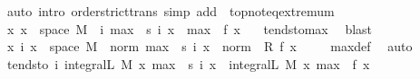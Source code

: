 \begin{isabellebody}
\ {\isacharparenleft}{\kern0pt}auto\ intro{\isacharcolon}{\kern0pt}\ order{\isachardot}{\kern0pt}strict{\isacharunderscore}{\kern0pt}trans{}\ simp\ add{\isacharcolon}{\kern0pt}\ \ top{\isachardot}{\kern0pt}not{\isacharunderscore}{\kern0pt}eq{\isacharunderscore}{\kern0pt}extremum{\isacharparenright}{\kern0pt}\isanewline
\ \ \ \ \isamarkupfalse%
\ {\isachardoublequoteopen}{\isasymAnd}x{\isachardot}{\kern0pt}\ x\ {\isasymin}\ space\ M\ {\isasymLongrightarrow}\ {\isacharparenleft}{\kern0pt}{\isasymlambda}i{\isachardot}{\kern0pt}\ max\ {}\ {\isacharparenleft}{\kern0pt}s\ i\ x{\isacharparenright}{\kern0pt}{\isacharparenright}{\kern0pt}\ {\isasymlonglonglongrightarrow}\ max\ {}\ {\isacharparenleft}{\kern0pt}f\ x{\isacharparenright}{\kern0pt}{\isachardoublequoteclose}\ \isamarkupfalse%
\ {\isacharasterisk}{\kern0pt}{\isacharparenleft}{\kern0pt}{}{\isacharparenright}{\kern0pt}\ tendsto{\isacharunderscore}{\kern0pt}max\ \isamarkupfalse%
\ blast\isanewline
\ \ \ \ \isamarkupfalse%
\ \isamarkupfalse%
\ {\isachardoublequoteopen}{\isasymAnd}x\ i{\isachardot}{\kern0pt}\ x\ {\isasymin}\ space\ M\ {\isasymLongrightarrow}\ norm\ {\isacharparenleft}{\kern0pt}max\ {}\ {\isacharparenleft}{\kern0pt}s\ i\ x{\isacharparenright}{\kern0pt}{\isacharparenright}{\kern0pt}\ {\isasymle}\ norm\ {\isacharparenleft}{\kern0pt}{}\ {\isacharasterisk}{\kern0pt}\isactrlsub R\ f\ x{\isacharparenright}{\kern0pt}{\isachardoublequoteclose}\ \isamarkupfalse%
\ {\isacharasterisk}{\kern0pt}{\isacharparenleft}{\kern0pt}{}{\isacharparenright}{\kern0pt}\ \isamarkupfalse%
\ max{\isacharunderscore}{\kern0pt}def\ \isamarkupfalse%
\ auto\isanewline
\ \ \ \ \isamarkupfalse%
\ \isamarkupfalse%
\ tendsto{\isacharcolon}{\kern0pt}\ {\isachardoublequoteopen}{\isacharparenleft}{\kern0pt}{\isasymlambda}i{\isachardot}{\kern0pt}\ integral\isactrlsup L\ M\ {\isacharparenleft}{\kern0pt}{\isasymlambda}x{\isachardot}{\kern0pt}\ max\ {}\ {\isacharparenleft}{\kern0pt}s\ i\ x{\isacharparenright}{\kern0pt}{\isacharparenright}{\kern0pt}{\isacharparenright}{\kern0pt}\ {\isasymlonglonglongrightarrow}\ integral\isactrlsup L\ M\ {\isacharparenleft}{\kern0pt}{\isasymlambda}x{\isachardot}{\kern0pt}\ max\ {}\ {\isacharparenleft}{\kern0pt}f\ x{\isacharparenright}{\kern0pt}{\isacharparenright}{\kern0pt}{\isachardoublequoteclose}\ \isanewline
\ \ \ \ \ \ \isamarkupfalse%

\end{isabellebody}
